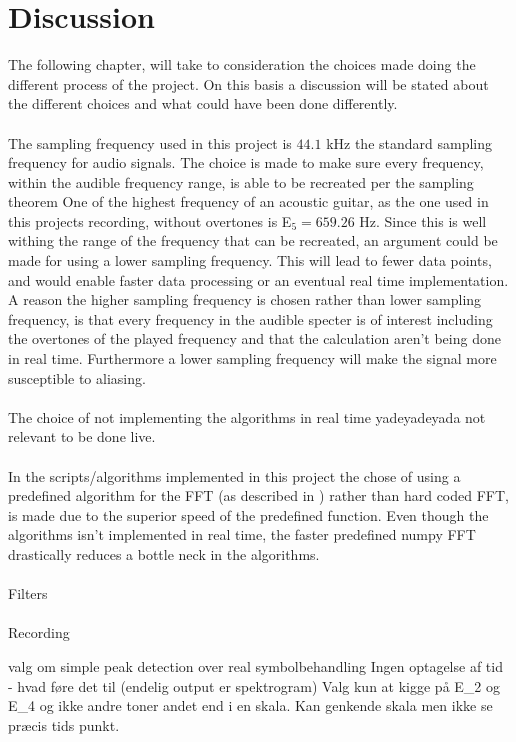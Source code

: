 \chapter{Discussion}
The following chapter, will take to consideration the choices made doing the different process of the project.
On this basis a discussion will be stated about the different choices and what could have been done differently.
\\\\
The sampling frequency used in this project is $44.1$ kHz the standard sampling frequency for audio signals.
The choice is made to make sure every frequency, within the audible frequency range, is able to be recreated per the sampling theorem 
One of the highest frequency of an acoustic guitar, as the one used in this projects recording, without overtones is E$_5 = 659.26$ Hz.
Since this is well withing the range of the frequency that can be recreated, an argument could be made for using a lower sampling frequency.
This will lead to fewer data points, and would enable faster data processing or an eventual real time implementation. 
A reason the higher sampling frequency is chosen rather than lower sampling frequency, is that every frequency in the audible specter is of interest including the overtones of the played frequency and that the calculation aren't being done in real time.
Furthermore a lower sampling frequency will make the signal more susceptible to aliasing. 
\\\\

The choice of not implementing the algorithms in real time yadeyadeyada not relevant to be done live. 
\\\\
In the scripts/algorithms implemented in this project the chose of using  a predefined algorithm for the FFT (as described in ) rather than hard coded FFT, is made due to the superior speed of the predefined function. 
Even though the algorithms isn't implemented in real time, the faster predefined numpy FFT drastically reduces a bottle neck in the algorithms.
\\\\
Filters
\\\\
Recording
 
valg om simple peak detection over real symbolbehandling
Ingen optagelse af tid - hvad føre det til
(endelig output er spektrogram)
Valg kun at kigge på E_2 og E_4 og ikke andre toner andet end i en skala.
Kan genkende skala men ikke se præcis tids punkt.

